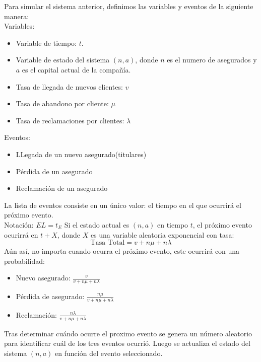\documentclass[12pt, a4paper]{article}
\begin{document}
Para simular el sistema anterior, definimos las variables y eventos de la siguiente manera:
\\
Variables: 
\begin{itemize}
    \item Variable de tiempo: $t$.
    \item Variable de estado del sistema $(n,a)$, donde $n$ es el numero de asegurados y $a$ es el capital actual de la compañía.
    \item Tasa de llegada de nuevos clientes: $v$
    \item Tasa de abandono por cliente: $\mu$
    \item Tasa de reclamaciones por clientes: $\lambda$
\end{itemize}
Eventos:
\begin{itemize}
    \item LLegada de un nuevo asegurado(titulares)
    \item Pérdida de un asegurado
    \item Reclamación de un asegurado
\end{itemize}
La lista de eventos consiste en un único valor: el tiempo en el que ocurrirá el próximo evento.\\
Notación: $EL = t_E$
Si el estado actual es $(n,a)$ en tiempo $t$, el próximo evento ocurirrá en $t + X$, donde $X$ es una variable
aleatoria exponencial con tasa:
$$ \text{Tasa Total}= v + n\mu + n\lambda$$
Aún así, no importa cuando ocurra el próximo evento, este ocurrirá con una probabilidad:
\begin{itemize}
    \item Nuevo asegurado: $\frac{v}{v+n\mu+n\lambda}$
    \item Pérdida de asegurado: $\frac{n\mu}{v+n\mu+n\lambda}$
    \item Reclamación: $\frac{n\lambda}{v+n\mu+n\lambda}$
\end{itemize}
Tras determinar cuándo ocurre el proximo evento se genera un número aleatorio para identificar
cuál de los tres eventos ocurrió. Luego se actualiza el estado del sistema $(n,a)$ en función del evento seleccionado.
\end{document}
